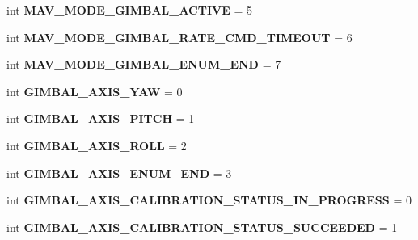 \begin{DoxyCompactItemize}
int {\bfseries M\+A\+V\+\_\+\+M\+O\+D\+E\+\_\+\+G\+I\+M\+B\+A\+L\+\_\+\+A\+C\+T\+I\+VE} = 5
\item 
\mbox{\label{namespacepymavlink_1_1dialects_1_1v10_a8933f6a80a72971186f883d0df7c99d7}} 
int {\bfseries M\+A\+V\+\_\+\+M\+O\+D\+E\+\_\+\+G\+I\+M\+B\+A\+L\+\_\+\+R\+A\+T\+E\+\_\+\+C\+M\+D\+\_\+\+T\+I\+M\+E\+O\+UT} = 6
\item 
\mbox{\label{namespacepymavlink_1_1dialects_1_1v10_afcc64d69151ec0039cac01798c7c4547}} 
int {\bfseries M\+A\+V\+\_\+\+M\+O\+D\+E\+\_\+\+G\+I\+M\+B\+A\+L\+\_\+\+E\+N\+U\+M\+\_\+\+E\+ND} = 7
\item 
\mbox{\label{namespacepymavlink_1_1dialects_1_1v10_a274be1f53d203b9b0a7e1097488e61c3}} 
int {\bfseries G\+I\+M\+B\+A\+L\+\_\+\+A\+X\+I\+S\+\_\+\+Y\+AW} = 0
\item 
\mbox{\label{namespacepymavlink_1_1dialects_1_1v10_a959ea37593683cbf53d077c8bbe1dc4f}} 
int {\bfseries G\+I\+M\+B\+A\+L\+\_\+\+A\+X\+I\+S\+\_\+\+P\+I\+T\+CH} = 1
\item 
\mbox{\label{namespacepymavlink_1_1dialects_1_1v10_a724d49bf3b686a95f41ab09215afea6c}} 
int {\bfseries G\+I\+M\+B\+A\+L\+\_\+\+A\+X\+I\+S\+\_\+\+R\+O\+LL} = 2
\item 
\mbox{\label{namespacepymavlink_1_1dialects_1_1v10_a8ecbb00aaeb7a651be0a12606de1057c}} 
int {\bfseries G\+I\+M\+B\+A\+L\+\_\+\+A\+X\+I\+S\+\_\+\+E\+N\+U\+M\+\_\+\+E\+ND} = 3
\item 
\mbox{\label{namespacepymavlink_1_1dialects_1_1v10_a6e8508fd1775fc4c6eb822a1bb553fdf}} 
int {\bfseries G\+I\+M\+B\+A\+L\+\_\+\+A\+X\+I\+S\+\_\+\+C\+A\+L\+I\+B\+R\+A\+T\+I\+O\+N\+\_\+\+S\+T\+A\+T\+U\+S\+\_\+\+I\+N\+\_\+\+P\+R\+O\+G\+R\+E\+SS} = 0
\item 
\mbox{\label{namespacepymavlink_1_1dialects_1_1v10_a14c1a0ce88132a580af0fea609cdd96f}} 
int {\bfseries G\+I\+M\+B\+A\+L\+\_\+\+A\+X\+I\+S\+\_\+\+C\+A\+L\+I\+B\+R\+A\+T\+I\+O\+N\+\_\+\+S\+T\+A\+T\+U\+S\+\_\+\+S\+U\+C\+C\+E\+E\+D\+ED} = 1

\end{DoxyCompactItemize}
